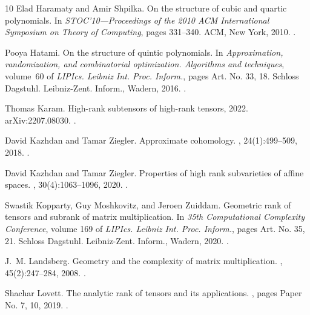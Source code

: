 \documentclass[10pt]{article}
\newcommand{\1}{\mathbf{1}}
\begin{document}
\begin{thebibliography}{10}
Elad Haramaty and Amir Shpilka.
\newblock On the structure of cubic and quartic polynomials.
\newblock In {\em S{TOC}'10---{P}roceedings of the 2010 {ACM} {I}nternational {S}ymposium on {T}heory of {C}omputing}, pages 331--340. ACM, New York, 2010.
\newblock \href {https://doi.org/10.1145/1806689.1806736} {}.

Pooya Hatami.
\newblock On the structure of quintic polynomials.
\newblock In {\em Approximation, randomization, and combinatorial optimization. {A}lgorithms and techniques}, volume~60 of {\em LIPIcs. Leibniz Int. Proc. Inform.}, pages Art. No. 33, 18. Schloss Dagstuhl. Leibniz-Zent. Inform., Wadern, 2016.
\newblock \href {https://doi.org/10.4230/LIPIcs.APPROX-RANDOM.2016.33} {}.

Thomas Karam.
\newblock High-rank subtensors of high-rank tensors, 2022.
\newblock arXiv:2207.08030.
\newblock \href {https://doi.org/10.48550/ARXIV.2207.08030} {}.

David Kazhdan and Tamar Ziegler.
\newblock Approximate cohomology.
, 24(1):499--509, 2018.
\newblock \href {https://doi.org/10.1007/s00029-017-0335-5} {}.

David Kazhdan and Tamar Ziegler.
\newblock Properties of high rank subvarieties of affine spaces.
, 30(4):1063--1096, 2020.
\newblock \href {https://doi.org/10.1007/s00039-020-00542-4} {}.

Swastik Kopparty, Guy Moshkovitz, and Jeroen Zuiddam.
\newblock Geometric rank of tensors and subrank of matrix multiplication.
\newblock In {\em 35th {C}omputational {C}omplexity {C}onference}, volume 169 of {\em LIPIcs. Leibniz Int. Proc. Inform.}, pages Art. No. 35, 21. Schloss Dagstuhl. Leibniz-Zent. Inform., Wadern, 2020.
\newblock \href {https://doi.org/10.4230/LIPIcs.CCC.2020.35} {}.

J.~M. Landsberg.
\newblock Geometry and the complexity of matrix multiplication.
, 45(2):247--284, 2008.
\newblock \href {https://doi.org/10.1090/S0273-0979-08-01176-2} {}.

Shachar Lovett.
\newblock The analytic rank of tensors and its applications.
, pages Paper No. 7, 10, 2019.
\newblock \href {https://doi.org/10.19086/da} {}.


\end{thebibliography}
\end{document}
